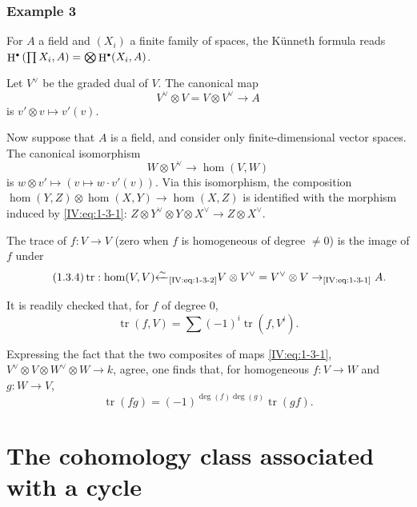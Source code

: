 \documentclass[12pt,oneside,english]{smfbook}
\DeclareMathOperator{\h}{H}
\DeclareMathOperator{\tr}{tr}
\let\oldbullet\bullet
\renewcommand{\bullet}{\textnormal{\tiny$\oldbullet$}}
\begin{document}
\subsubsection*{Example 3}

For $A$ a field and $(X_i)$ a finite family of spaces, the K\"unneth formula reads $\h^\bullet\left(\prod X_i,A\right) = \bigotimes \h^\bullet(X_i,A)$.

Let $V^\vee$ be the graded dual of $V$. The canonical map
\begin{equation*}\tag{1.3.1}\label{IV:eq:1-3-1}
  V^\vee\otimes V = V\otimes V^\vee \to A
\end{equation*}
is $v'\otimes v\mapsto v'(v)$.

Now suppose that $A$ is a field, and consider only finite-dimensional vector spaces. The canonical isomorphism
\begin{equation*}\tag{1.3.2}\label{IV:eq:1-3-2}
  W\otimes V^\vee \to \hom(V,W)
\end{equation*}
is $w\otimes v'\mapsto(v\mapsto w\cdot v'(v))$. Via this isomorphism, the composition $\hom(Y,Z)\otimes\hom(X,Y)\to\hom(X,Z)$ is identified with the morphism induced by \eqref{IV:eq:1-3-1}: $Z\otimes Y^\vee\otimes Y\otimes X^\vee \to Z\otimes X^\vee$.

The trace of $f:V\to V$ (zero when $f$ is homogeneous of degree $\ne0$) is the image of $f$ under
\begin{equation*}\tag{1.3.4}\label{IV:eq:1-3-4}
  \tr:\hom(V,V) {\xleftarrow\sim}_\text{\eqref{IV:eq:1-3-2}} V\otimes V^\vee = V^\vee \otimes V \to_\text{\eqref{IV:eq:1-3-1}} A .
\end{equation*}

It is readily checked that, for $f$ of degree $0$,
\begin{equation*}\tag{1.3.5}\label{IV:eq:1-3-5}
  \tr(f,V) = \sum (-1)^i \tr(f,V^i) \text{.}
\end{equation*}

Expressing the fact that the two composites of maps \eqref{IV:eq:1-3-1}, $V^\vee\otimes V\otimes W^\vee\otimes W\to k$, agree, one finds that, for homogeneous $f:V\to W$ and $g:W\to V$,
\begin{equation*}\tag{1.3.6}\label{IV:eq:1-3-6}
  \tr(f g) = (-1)^{\deg(f)\deg(g)} \tr(g f) \text{.}
\end{equation*}

\section{The cohomology class associated with a cycle}\label{IV:2}
\end{document}
